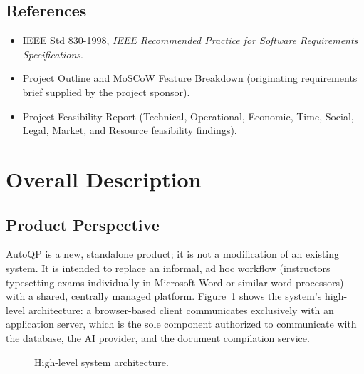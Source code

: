\documentclass[11pt]{article}
\begin{document}
\subsection{References}
\begin{itemize}[nosep]
  \item IEEE Std 830-1998, \emph{IEEE Recommended Practice for Software
    Requirements Specifications}.
  \item Project Outline and MoSCoW Feature Breakdown (originating
    requirements brief supplied by the project sponsor).
  \item Project Feasibility Report (Technical, Operational, Economic, Time,
    Social, Legal, Market, and Resource feasibility findings).
\end{itemize}

\section{Overall Description}

\subsection{Product Perspective}
AutoQP is a new, standalone product; it is not a modification of an
existing system. It is intended to replace an informal, ad hoc workflow
(instructors typesetting exams individually in Microsoft Word or similar
word processors) with a shared, centrally managed platform. Figure~1 shows
the system's high-level architecture: a browser-based client communicates
exclusively with an application server, which is the sole component
authorized to communicate with the database, the AI provider, and the
document compilation service.

\begin{figure}[h]
\centering
{}
\caption{High-level system architecture.}
\end{figure}
\end{document}

